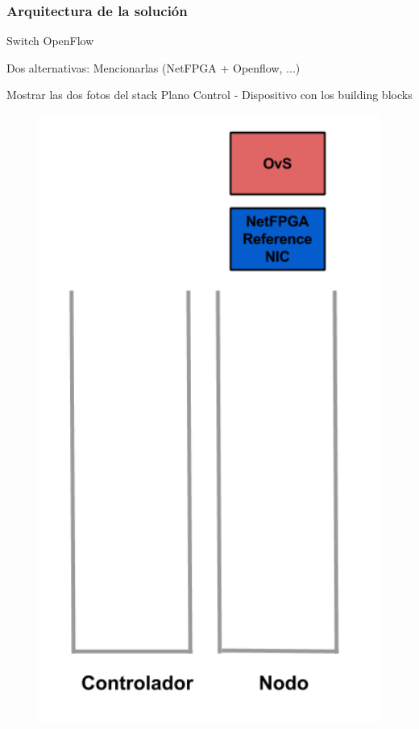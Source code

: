 \documentclass{beamer}
\begin{document}
\begin{frame}
\frametitle{Arquitectura de la soluci\'on} 

\begin{minipage}{0.60\textwidth}
Switch OpenFlow

Dos alternativas: Mencionarlas (NetFPGA + Openflow, ...)

Mostrar las dos fotos del stack Plano Control - Dispositivo con los building blocks

\end{minipage}
\hfill
\begin{minipage}{0.30\textwidth}
\begin{figure}[H]
\raggedright
\includegraphics[width=1.0\textwidth, right]{imagenes/BuilidngBlocks1.png}
\end{figure}
\end{minipage} 



\end{frame}
\end{document}
